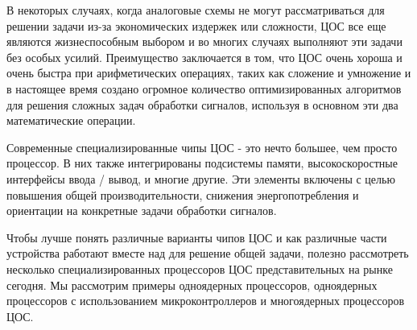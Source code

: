 \label{sec:intro}

В некоторых случаях, когда аналоговые схемы не могут рассматриваться для решении задачи из-за экономических издержек или сложности, ЦОС все еще являются жизнеспособным выбором и во многих случаях выполняют эти задачи без особых усилий. Преимущество заключается в том, что ЦОС очень хороша и очень быстра при арифметических операциях, таких как сложение и умножение и в настоящее время создано огромное количество оптимизированных алгоритмов для решения сложных задач обработки сигналов, используя в основном эти два математические операции.

Современные специализированные чипы ЦОС - это нечто большее, чем просто процессор. В них также интегрированы подсистемы памяти, высокоскоростные интерфейсы ввода / вывод, и многие другие. Эти элементы включены с целью повышения общей производительности, снижения энергопотребления и ориентации на конкретные задачи обработки сигналов.

Чтобы лучше понять различные варианты чипов ЦОС и как различные части устройства работают вместе над для решение общей задачи, полезно рассмотреть несколько специализированных процессоров ЦОС представительных на рынке сегодня. Мы рассмотрим примеры одноядерных процессоров, одноядерных процессоров с использованием микроконтроллеров и многоядерных процессоров ЦОС.
